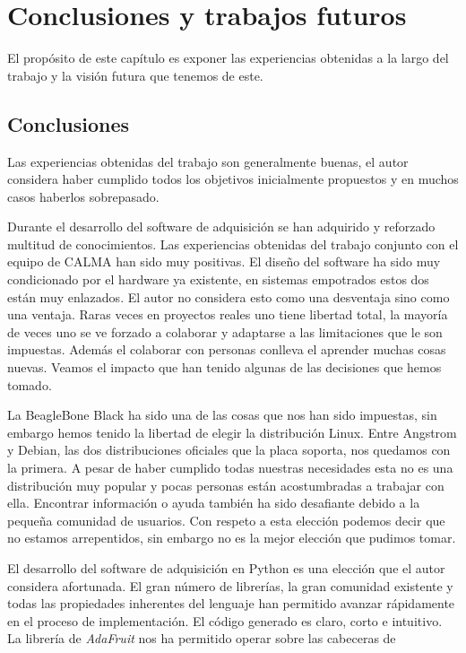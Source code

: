 \chapter{Conclusiones y trabajos futuros}
\label{cap_conclusiones}
El propósito de este capítulo es exponer las experiencias obtenidas a la largo del trabajo y la visión futura que tenemos de este.

\section{Conclusiones}
	Las experiencias obtenidas del trabajo son generalmente buenas, el autor considera haber cumplido todos los objetivos inicialmente propuestos
	y en muchos casos haberlos sobrepasado. 
	\par
	Durante el desarrollo del software de adquisición  se han adquirido y reforzado multitud de conocimientos. Las experiencias obtenidas del
	trabajo conjunto con el equipo de CALMA han sido muy positivas. El diseño del software ha sido muy condicionado por el hardware ya existente,
	en sistemas empotrados estos dos están muy enlazados. El autor no considera esto como una desventaja sino como una ventaja. Raras veces en
	proyectos reales uno tiene libertad total, la mayoría de veces uno se ve forzado  a colaborar y adaptarse a las limitaciones que le son
	impuestas. Además el colaborar con personas conlleva el aprender muchas cosas nuevas. Veamos el impacto que han tenido algunas de las
	decisiones que hemos tomado.
	\par
	La BeagleBone Black ha sido una de las cosas que nos han sido impuestas, sin embargo hemos tenido la libertad de elegir la distribución Linux.
	Entre Angstrom y Debian, las dos distribuciones oficiales que la placa soporta, nos quedamos con la primera. A pesar de haber cumplido todas
	nuestras necesidades esta no es una distribución muy popular y pocas personas están acostumbradas a trabajar con ella. Encontrar información o
	ayuda también ha sido desafiante debido a la pequeña comunidad de usuarios. Con respeto a esta elección podemos decir que no estamos
	arrepentidos, sin embargo no es la mejor elección que pudimos tomar. 
	\par
	El desarrollo del software de adquisición en Python es una elección que el autor considera afortunada. El gran número de librerías, la gran
	comunidad existente y todas las propiedades inherentes del lenguaje han permitido avanzar rápidamente en el proceso de implementación. El
	código generado es claro, corto e intuitivo. La librería de \emph{AdaFruit}\cite{AdaFruitGit} nos ha permitido operar sobre las cabeceras de
